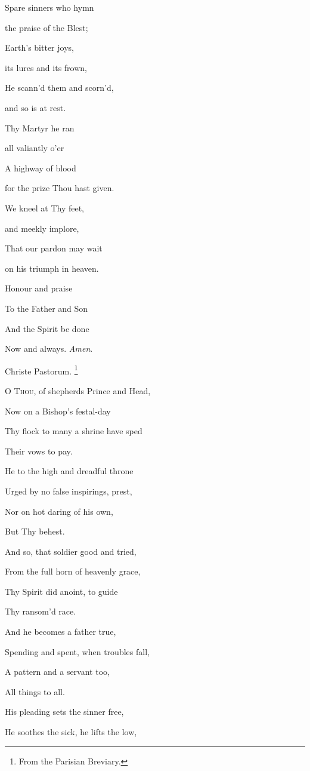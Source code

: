 Spare sinners who hymn

the praise of the Blest;

Earth's bitter joys,

its lures and its frown,

He scann'd them and scorn'd,

and so is at rest.

Thy Martyr he ran

all valiantly o'er

A highway of blood

for the prize Thou hast given.

We kneel at Thy feet,

and meekly implore,

That our pardon may wait

on his triumph in heaven.

Honour and praise

To the Father and Son

And the Spirit be done

Now and always. \emph{Amen}.


Christe Pastorum. \footnote{From the Parisian Breviary.}

O T\textsc{hou}, of shepherds
Prince and Head,

Now on a Bishop's
festal-day

Thy flock to many a shrine have sped

Their vows to pay.

He to the high and dreadful throne

Urged by no false
inspirings, prest,

Nor on hot daring of his own,

But Thy behest.

And so, that soldier good and tried,

From the full horn of
heavenly grace,

Thy Spirit did anoint, to guide

Thy ransom'd race. 

And he becomes a father true,

Spending and spent, when troubles fall,

A pattern and a servant too,

All things to all.

His pleading sets the sinner free,

He soothes the sick, he lifts the low,

